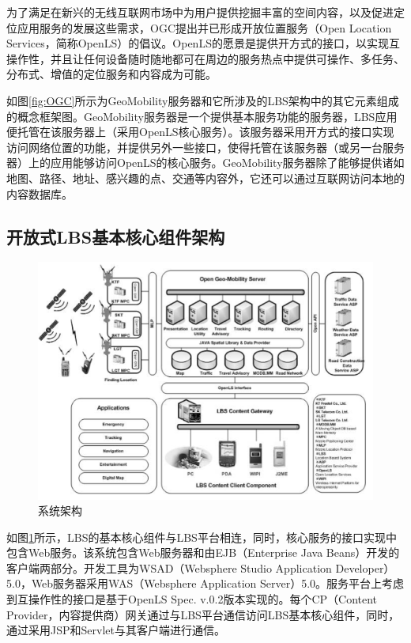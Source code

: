\documentclass{article}
\begin{document}
\begin{CJK}{UTF8}{gbsn}
	为了满足在新兴的无线互联网市场中为用户提供挖掘丰富的空间内容，以及促进定位应用服务的发展这些需求，OGC提出并已形成开放位置服务（Open Location Services，简称OpenLS）的倡议。OpenLS的愿景是提供开方式的接口，以实现互操作性，并且让任何设备随时随地都可在周边的服务热点中提供可操作、多任务、分布式、增值的定位服务和内容成为可能。

	如图\ref{fig:OGC}所示为GeoMobility服务器和它所涉及的LBS架构中的其它元素组成的概念框架图。GeoMobility服务器是一个提供基本服务功能的服务器，LBS应用便托管在该服务器上（采用OpenLS核心服务）。该服务器采用开方式的接口实现访问网络位置的功能，并提供另外一些接口，使得托管在该服务器（或另一台服务器）上的应用能够访问OpenLS的核心服务。GeoMobility服务器除了能够提供诸如地图、路径、地址、感兴趣的点、交通等内容外，它还可以通过互联网访问本地的内容数据库。

	\subsection{开放式LBS基本核心组件架构}
	\begin{figure}[htbp]
		\centering
		\includegraphics[bb=0 0 1057 749, scale=0.4]{figure/fig04.png}
		\caption{系统架构}
		\label{fig:system-architecture}
	\end{figure}

	如图\ref{fig:system-architecture}所示，LBS的基本核心组件与LBS平台相连，同时，核心服务的接口实现中包含Web服务。该系统包含Web服务器和由EJB（Enterprise Java Beans）开发的客户端两部分。开发工具为WSAD（Websphere Studio Application Developer）5.0，Web服务器采用WAS（Websphere Application Server）5.0。服务平台上考虑到互操作性的接口是基于OpenLS Spec.\cite{OpenLS, OpenLS2, OpenLS3} v.0.2版本实现的。每个CP（Content Provider，内容提供商）网关通过与LBS平台通信访问LBS基本核心组件，同时，通过采用JSP和Servlet与其客户端进行通信。


\end{CJK}
\end{document}
